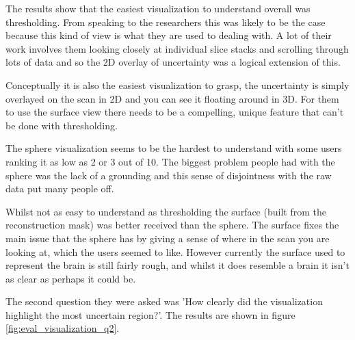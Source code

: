 The results show that the easiest visualization to understand overall was thresholding. From speaking to the researchers this was likely to be the case because this kind of view is what they are used to dealing with. A lot of their work involves them looking closely at individual slice stacks and scrolling through lots of data and so the 2D overlay of uncertainty was a logical extension of this.

Conceptually it is also the easiest visualization to grasp, the uncertainty is simply overlayed on the scan in 2D and you can see it floating around in 3D. For them to use the surface view there needs to be a compelling, unique feature that can't be done with thresholding.

The sphere visualization seems to be the hardest to understand with some users ranking it as low as 2 or 3 out of 10. The biggest problem people had with the sphere was the lack of a grounding and this sense of disjointness with the raw data put many people off.

Whilst not as easy to understand as thresholding the surface (built from the reconstruction mask) was better received than the sphere. The surface fixes the main issue that the sphere has by giving a sense of where in the scan you are looking at, which the users seemed to like. However currently the surface used to represent the brain is still fairly rough, and whilst it does resemble a brain it isn't as clear as perhaps it could be.

The second question they were asked was 'How clearly did the visualization highlight the most uncertain region?'. The results are shown in figure \ref{fig:eval_visualization_q2}.

